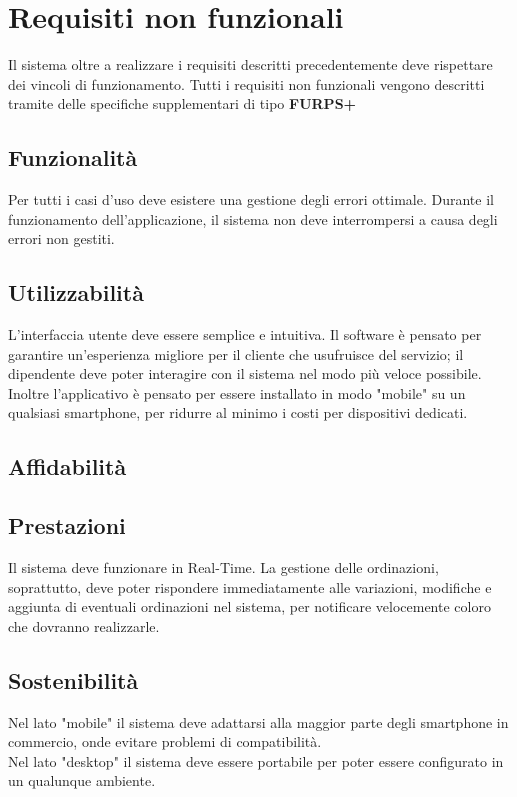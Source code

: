 \section{Requisiti non funzionali}
Il sistema oltre a realizzare i requisiti descritti precedentemente deve rispettare dei vincoli di funzionamento. Tutti i requisiti non funzionali vengono descritti tramite delle specifiche supplementari di tipo \textbf{FURPS+}

\subsection{Funzionalità}
Per tutti i casi d'uso deve esistere una gestione degli errori ottimale. Durante il funzionamento dell'applicazione, il sistema non deve interrompersi a causa degli errori non gestiti.

\subsection{Utilizzabilità}
L'interfaccia utente deve essere semplice e intuitiva. Il software è pensato per garantire un'esperienza migliore per il cliente che usufruisce del servizio; il dipendente deve poter interagire con il sistema nel modo più veloce possibile.
\\Inoltre l'applicativo è pensato per essere installato in modo "mobile" su un qualsiasi smartphone, per ridurre al minimo i costi per dispositivi dedicati.

\subsection{Affidabilità}

\subsection{Prestazioni}
Il sistema deve funzionare in Real-Time. La gestione delle ordinazioni, soprattutto, deve poter rispondere immediatamente alle variazioni, modifiche e aggiunta di eventuali ordinazioni nel sistema, per notificare velocemente coloro che dovranno realizzarle.

\subsection{Sostenibilità}
Nel lato "mobile" il sistema deve adattarsi alla maggior parte degli smartphone in commercio, onde evitare problemi di compatibilità. \\
Nel lato "desktop" il sistema deve essere portabile per poter essere configurato in un qualunque ambiente. 